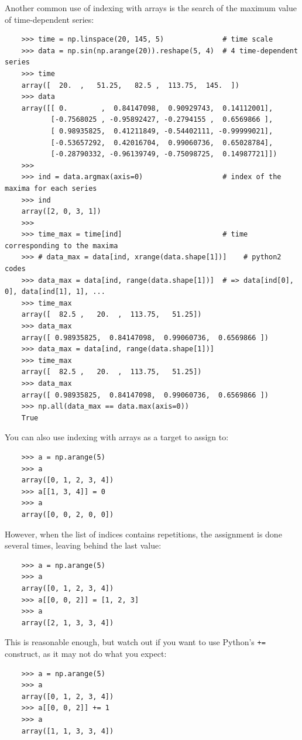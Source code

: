 \documentclass[UTF8]{article}
\begin{document}
Another common use of indexing with arrays is the search of the maximum value of time-dependent
series:
\begin{verbatim}
    >>> time = np.linspace(20, 145, 5)              # time scale
    >>> data = np.sin(np.arange(20)).reshape(5, 4)  # 4 time-dependent series
    >>> time
    array([  20.  ,   51.25,   82.5 ,  113.75,  145.  ])
    >>> data
    array([[ 0.        ,  0.84147098,  0.90929743,  0.14112001],
           [-0.7568025 , -0.95892427, -0.2794155 ,  0.6569866 ],
           [ 0.98935825,  0.41211849, -0.54402111, -0.99999021],
           [-0.53657292,  0.42016704,  0.99060736,  0.65028784],
           [-0.28790332, -0.96139749, -0.75098725,  0.14987721]])
    >>>
    >>> ind = data.argmax(axis=0)                   # index of the maxima for each series
    >>> ind
    array([2, 0, 3, 1])
    >>>
    >>> time_max = time[ind]                        # time corresponding to the maxima
    >>> # data_max = data[ind, xrange(data.shape[1])]    # python2 codes
    >>> data_max = data[ind, range(data.shape[1])]  # => data[ind[0], 0], data[ind[1], 1], ...
    >>> time_max
    array([  82.5 ,   20.  ,  113.75,   51.25])
    >>> data_max
    array([ 0.98935825,  0.84147098,  0.99060736,  0.6569866 ])
    >>> data_max = data[ind, range(data.shape[1])]
    >>> time_max
    array([  82.5 ,   20.  ,  113.75,   51.25])
    >>> data_max
    array([ 0.98935825,  0.84147098,  0.99060736,  0.6569866 ])
    >>> np.all(data_max == data.max(axis=0))
    True
\end{verbatim}

You can also use indexing with arrays as a target to assign to:
\begin{verbatim}
    >>> a = np.arange(5)
    >>> a
    array([0, 1, 2, 3, 4])
    >>> a[[1, 3, 4]] = 0
    >>> a
    array([0, 0, 2, 0, 0])
\end{verbatim}

However, when the list of indices contains repetitions, the assignment is done several times,
leaving behind the last value:
\begin{verbatim}
    >>> a = np.arange(5)
    >>> a
    array([0, 1, 2, 3, 4])
    >>> a[[0, 0, 2]] = [1, 2, 3]
    >>> a
    array([2, 1, 3, 3, 4])
\end{verbatim}

This is reasonable enough, but watch out if you want to use Python's \texttt{+=} construct, as it
may not do what you expect:
\begin{verbatim}
    >>> a = np.arange(5)
    >>> a
    array([0, 1, 2, 3, 4])
    >>> a[[0, 0, 2]] += 1
    >>> a
    array([1, 1, 3, 3, 4])
\end{verbatim}
\end{document}
